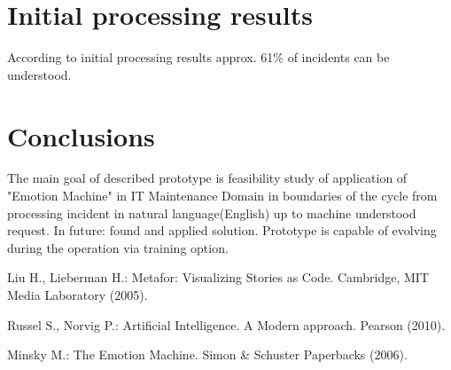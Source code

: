 \documentclass[runningheads,a4paper]{llncs}
\begin{document}
\section{Initial processing results}

According to initial processing results approx. 61\% of incidents can be understood. 

\section{Conclusions}

The main goal of described prototype is feasibility study of application of "Emotion Machine" \cite{mmem} in IT Maintenance Domain in boundaries of the cycle from processing incident in natural language(English) up to machine understood request. In future: found and applied solution. Prototype is capable of evolving during the operation via training option.

\begin{thebibliography}{4}

Liu H., Lieberman H.:
Metafor: Visualizing Stories as Code.
Cambridge, MIT Media Laboratory  (2005).

Russel S., Norvig P.:
Artificial Intelligence. A Modern approach.
Pearson (2010).

Minsky M.:
The Emotion Machine.
Simon \& Schuster Paperbacks  (2006).

\end{thebibliography}
\end{document}
